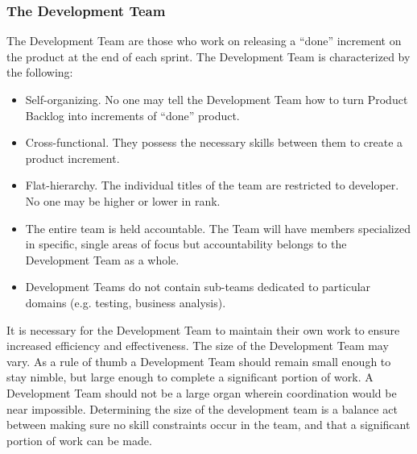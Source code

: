\subsubsection{The Development Team}

The Development Team are those who work on releasing a ``done'' increment on the product at
the end of each sprint\cite{scrumguide11}. The Development Team is characterized by the
following:

\begin{itemize}
	\item Self-organizing. No one may tell the Development Team how to turn Product Backlog
into increments of ``done'' product.
	\item	Cross-functional. They possess the necessary skills between them to create a product
increment.
	\item	Flat-hierarchy. The individual titles of the team are restricted to developer. No
one may be higher or lower in rank.
	\item	The entire team is held accountable. The Team will have members specialized in
specific, single areas of focus but accountability belongs to the Development Team as a
whole.
	\item	Development Teams do not contain sub-teams dedicated to particular domains (e.g.
testing, business analysis)\cite{scrumguide11}.
\end{itemize}


It is necessary for the Development Team to maintain their own work to ensure increased
efficiency and effectiveness.
The size of the Development Team may vary. As a rule of thumb a Development Team should
remain small enough to stay nimble, but large enough to complete a significant portion of
work\cite{scrumguide11}. A Development Team should not be a large organ wherein coordination
would be near impossible. Determining the size of the development team is
a balance act between making sure no skill constraints occur in the team, and that a
significant portion of work can be made\cite{scrumguide11}.